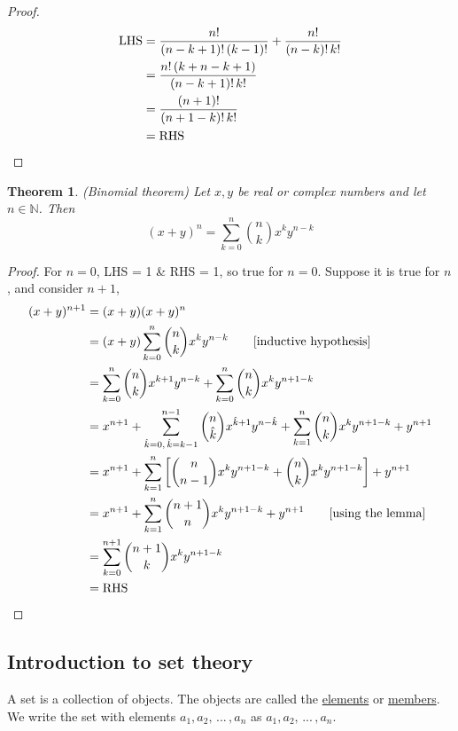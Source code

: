 \documentclass{article}
\newtheorem{theorem}{Theorem}
\begin{document}
\begin{proof}
  \begin{equation*}
    \begin{split}
      \textnormal{LHS} &= \frac{n!}{(n-k+1)!\,(k-1)!} + \frac{n!}{(n-k)!\,k!}\\
      &= \frac{n!\,(k+n-k+1)}{(n-k+1)!\,k!}\\
      &= \frac{(n+1)!}{(n+1-k)!\,k!}\\
      &= \textnormal{RHS}\\
    \end{split} 
  \end{equation*}
\end{proof}

\begin{theorem}
  (Binomial theorem) Let $x, y$ be real or complex numbers and let $n\in\mathbb{N}$. Then
  $$
    (x+y)^{n} = \sum_{k=0}^{n}\binom{n}{k}x^{k}y^{n-k}
  $$
\end{theorem}

\begin{proof}
  For $n=0$, LHS = 1 \& RHS = 1, so true for $n=0$. Suppose it is true for $n$, and consider $n+1$,
\begin{equation*}
  \begin{split}
    (x+y)^{n+1} &=(x+y)(x+y)^{n}\\
    &= (x+y)\sum^{n}_{k=0}\binom{n}{k}x^{k}y^{n-k}\quad\quad\textnormal{[inductive hypothesis]}\\
    &= \sum^{n}_{k=0}\binom{n}{k}x^{k+1}y^{n-k} + \sum^{n}_{k=0}\binom{n}{k}x^{k}y^{n+1-k}\\
    &= x^{n+1} + \sum^{n-1}_{\hat{k}=0,\,\hat{k}=k-1}\binom{n}{\hat{k}}x^{\hat{k}+1}y^{n-\hat{k}} + \sum^{n}_{k=1}\binom{n}{k}x^{k}y^{n+1-k} + y^{n+1}\\
    &= x^{n+1} + \sum^{n}_{k=1}\left[\binom{n}{n-1}x^{k}y^{n+1-k} + \binom{n}{k}x^{k}y^{n+1-k}\right] + y^{n+1}\\
    &= x^{n+1} + \sum^{n}_{k=1}\binom{n+1}{n}x^{k}y^{n+1-k} + y^{n+1}\quad\quad\textnormal{[using the lemma]}\\
    &= \sum_{k=0}^{n+1}\binom{n+1}{k}x^{k}y^{n+1-k}\\
    &= \textnormal{RHS}\\
  \end{split}
\end{equation*}
\end{proof}

\subsection{Introduction to set theory}
A set is a collection of objects. The objects are called the \underline{elements} or \underline{members}. We write the set with elements $a_{1}, a_{2},\,...\,,a_{n}$ as ${a_{1}, a_{2},\,...\,,a_{n}}$.
\end{document}
